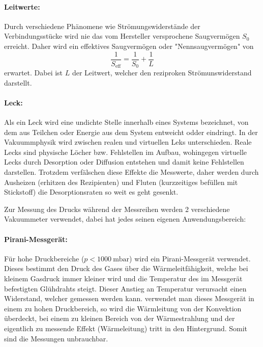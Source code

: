  \paragraph{Leitwerte:}
 Durch verschiedene Phänomene wie Strömungswiderstände der Verbindungsstücke wird nie das vom Hersteller versprochene Saugvermögen $S_0$ erreicht.
 Daher wird ein effektives Saugvermögen oder "Nennsaugvermögen" von
 \begin{equation}
   \frac{1}{S_\text{eff}} = \frac{1}{S_0} + \frac{1}{L}
   \label{eqn:effSaug}
 \end{equation}
 erwartet. Dabei ist $L$ der Leitwert, welcher den reziproken Strömunswiderstand darstellt.

 \paragraph{Leck:}
 Als ein Leck wird eine undichte Stelle innerhalb eines Systems bezeichnet, von dem aus Teilchen oder Energie aus dem System
 entweicht odder eindringt.
 In der Vakuummphysik wird zwischen realen und virtuellen Leks unterschieden. Reale Lecks sind physische Löcher bzw. Fehlstellen
 im Aufbau, wohingegen virtuelle Lecks durch Desorption oder Diffusion entstehen und damit keine Fehlstellen darstellen.
 Trotzdem verfälschen diese Effekte die Messwerte, daher werden durch Ausheizen (erhitzen des Rezipienten) und Fluten (kurzzeitiges
 befüllen mit Stickstoff) die Desorptionsraten so weit es geht gesenkt.

 Zur Messung des Drucks während der Messreihen werden 2 verschiedene Vakuummeter verwendet, dabei hat jedes seinen eigenen Anwendungsbereich:

 \paragraph{Pirani-Messgerät:}
 Für hohe Druckbereiche ($p < \SI{1000}{\milli\bar}$) wird ein Pirani-Messgerät verwendet. Dieses bestimmt den Druck des Gases über die Wärmeleitfähigkeit, welche
 bei kleinem Gasdruck immer kleiner wird und die Temperatur des im Messgerät befestigten Glühdrahts steigt. Dieser Anstieg an Temperatur verursacht einen Widerstand,
 welcher gemessen werden kann. verwendet man dieses Messgerät in einem zu hohen Druckbereich, so wird die Wärmleitung von der Konvektion überdeckt, bei einem zu kleinen
 Bereich von der Wärmestrahlung und der eigentlich zu messende Effekt (Wärmeleitung) tritt in den Hintergrund. Somit sind die Messungen unbrauchbar.

